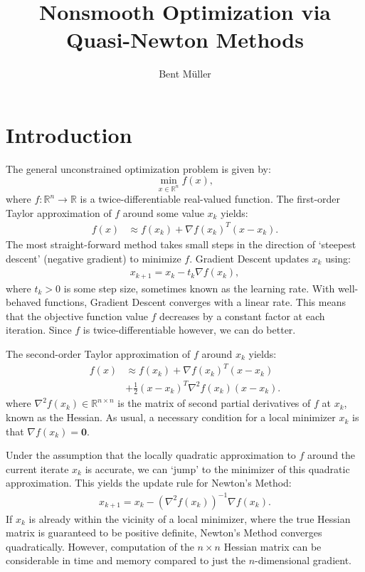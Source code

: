 \documentclass{article}
\title{Nonsmooth Optimization via Quasi-Newton Methods}
\author{Bent M\"uller}
\begin{document}
\maketitle

\section{Introduction}

The general unconstrained optimization problem is given by:
\begin{equation}
    \min_{x \in \mathbb{R}^n} f(x),
    \label{eq:unconstrained_optimization_problem}
\end{equation}
where $f: \mathbb{R}^n \to \mathbb{R}$ is a twice-differentiable
real-valued function.
The first-order Taylor approximation of $f$ around
some value $x_k$ yields:
\begin{align}
    f(x) & \approx f(x_k) + \nabla f(x_k)^T (x - x_k).
\end{align}
The most straight-forward method takes small steps in the direction
of `steepest descent' (negative gradient) to minimize $f$.
Gradient Descent updates $x_k$ using:
\begin{align}
    x_{k+ 1} = x_k - t_k \nabla f(x_k),
    \label{eq:gradient_descent_update_rule}
\end{align}
where $t_k > 0$ is some step size, sometimes known as
the learning rate.
With well-behaved functions, Gradient Descent converges
with a linear rate.
This means that the objective function value $f$ decreases
by a constant factor at each iteration.
Since $f$ is twice-differentiable however, we can do better.

The second-order Taylor approximation of $f$ around $x_k$ yields:
\begin{align}
    f(x) & \approx f(x_k) + \nabla f(x_k)^T (x - x_k)           \\
         & + \frac{1}{2} (x - x_k)^T \nabla^2 f(x_k) (x - x_k).
\end{align}
where $\nabla^2 f(x_k) \in \mathbb{R}^{n \times n}$ is the matrix
of second partial derivatives of $f$ at $x_k$, known as the Hessian.
As usual, a necessary condition for a local minimizer $x_k$ is that
$\nabla f(x_k) = \mathbf{0}$.

Under the assumption that the locally quadratic approximation to $f$
around the current iterate $x_k$ is accurate, we can
`jump' to the minimizer of this quadratic approximation.
This yields the update rule for Newton's Method:
\begin{align}
    x_{k+1} = x_k - (\nabla^2 f(x_k))^{-1} \nabla f(x_k).
    \label{eq:newtons_method_update_rule}
\end{align}
If $x_k$ is already within the vicinity of a local minimizer,
where the true Hessian matrix is guaranteed to be positive definite,
Newton's Method converges quadratically.
However, computation of the $n \times n$ Hessian matrix can be considerable
in time and memory compared to just the $n$-dimensional gradient.
\end{document}
